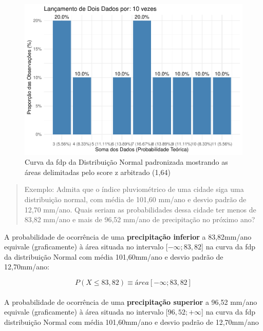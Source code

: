 \documentclass[
]{book}
\begin{document}
\begin{figure}[H]

{\centering \includegraphics{apostila_files/figure-latex/unnamed-chunk-81-1} 

}

\caption{Curva da fdp da Distribuição Normal padronizada mostrando as áreas delimitadas pelo score z arbitrado (1,64)}\label{fig:unnamed-chunk-81}
\end{figure}

\hfill\break

\begin{quote}
Exemplo: Admita que o índice pluviométrico de uma cidade siga uma distribuição normal, com média de 101,60 mm/ano e desvio padrão de 12,70 mm/ano. Quais seriam as probabilidades dessa cidade ter menos de 83,82 mm/ano e mais de 96,52 mm/ano de precipitação no próximo ano?
\end{quote}

\hfill\break

A probabilidade de ocorrência de uma \textbf{precipitação inferior} a 83,82mm/ano equivale (graficamente) à área situada no intervalo {[}\(-\infty ; 83,82\){]} na curva da fdp da distribuição Normal com média 101,60mm/ano e desvio padrão de 12,70mm/ano:

\hfill\break

\[
P(X \le 83,82) \equiv área[-\infty ; 83,82]
\]\\

A probabilidade de ocorrência de uma \textbf{precipitação superior} a 96,52 mm/ano equivale (graficamente) à área situada no intervalo {[}\(96,52 ; +\infty\){]} na curva da fdp distribuição Normal com média 101,60mm/ano e desvio padrão de 12,70mm/ano
\end{document}
